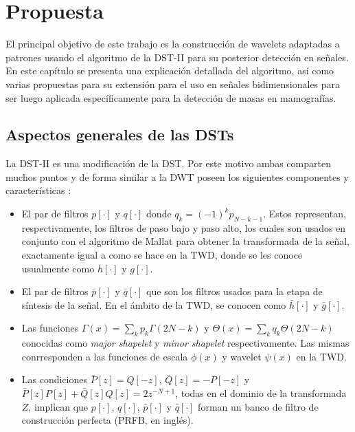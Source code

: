 \chapter{Propuesta}\label{chapter:proposal}

El principal objetivo de este trabajo es la construcción de wavelets adaptadas a patrones usando el algoritmo de
la DST-II \cite{Guido2018} para su posterior detección en señales. En este capítulo se presenta una explicación 
detallada del algoritmo, así como varias propuestas para su extensión para el uso en señales bidimensionales para
ser luego aplicada específicamente para la detección de masas en mamografías.

\section{Aspectos generales de las DSTs}

La DST-II es una modificación de la DST. Por este motivo ambas comparten muchos puntos y de forma similar 
a la DWT poseen los siguientes componentes y características \cite{Guido2008}\cite{Guido2018}:

\begin{itemize}
	\item El par de filtros $p[\cdot]$ y $q[\cdot]$ donde $q_k = (-1)^k p_{N-k-1}$. 
		Estos representan, respectivamente, los filtros de paso bajo y paso alto, los cuales son  
		usados en conjunto con el algoritmo de Mallat para obtener la transformada de la 
		señal, exactamente igual a como se hace en la TWD, donde se les conoce usualmente como $h[\cdot]$ y
		$g[\cdot]$.
	\item El par de filtros $\bar p[\cdot]$  y $\bar q[\cdot]$ que son los filtros usados para la etapa 
		de síntesis de la señal. En el ámbito de la TWD, se conocen como $\bar h[\cdot]$ y $\bar g[\cdot]$.
	\item Las funciones $\displaystyle \Gamma(x)=\sum_k p_k \Gamma(2N-k)$ y $\displaystyle \Theta(x)=\sum_k q_k \Theta(2N-k)$ conocidas 
		como \textit{major shapelet} y \textit{minor shapelet} respectivamente. Las mismas conrresponden a las
		funciones de escala $\phi(x)$ y wavelet $\psi(x)$ en la TWD.
	\item Las condiciones $\bar P[z] = Q[-z]$, $\bar Q[z]=-P[-z]$ y $\bar P[z]P[z] + \bar Q[z]Q[z]=2z^{-N+1}$,
		todas en el dominio de la transformada $Z$, implican que $p[\cdot]$, $q[\cdot]$, $\bar p[\cdot]$  y $\bar q[\cdot]$
		forman un banco de filtro de construcción perfecta (PRFB, en inglés).
\end{itemize}

